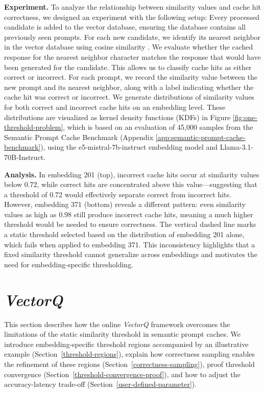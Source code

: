 \textbf{Experiment.} To analyze the relationship between similarity values and cache hit correctness, we designed an experiment with the following setup: Every processed candidate is added to the vector database, ensuring the database contains all previously seen prompts. For each new candidate, we identify its nearest neighbor in the vector database using cosine similarity \cite{rahutomo2012semantic}. We evaluate whether the cached response for the nearest neighbor character matches the response that would have been generated for the candidate. This allows us to classify cache hits as either correct or incorrect. For each prompt, we record the similarity value between the new prompt and its nearest neighbor, along with a label indicating whether the cache hit was correct or incorrect. We generate distributions of similarity values for both correct and incorrect cache hits on an embedding level. These distributions are visualized as kernel density functions (KDFs) in Figure \ref{fig:one-threshold-problem}, which is based on an evaluation of 45,000 samples from the Semantic Prompt Cache Benchmark (Appendix \ref{app:semantic-prompt-cache-benchmark}), using the e5-mistral-7b-instruct embedding model and Llama-3.1-70B-Instruct.

\textbf{Analysis.} In embedding 201 (top), incorrect cache hits occur at similarity values below 0.72, while correct hits are concentrated above this value—suggesting that a threshold of 0.72 would effectively separate correct from incorrect hits. However, embedding 371 (bottom) reveals a different pattern: even similarity values as high as 0.98 still produce incorrect cache hits, meaning a much higher threshold would be needed to ensure correctness. The vertical dashed line marks a static threshold selected based on the distribution of embedding 201 alone, which fails when applied to embedding 371. This inconsistency highlights that a fixed similarity threshold cannot generalize across embeddings and motivates the need for embedding-specific thresholding. 


\section{\textit{VectorQ}}
This section describes how the online \textit{VectorQ} framework overcomes the limitations of the static similarity threshold in semantic prompt caches. 
We introduce embedding-specific threshold regions accompanied by an illustrative example (Section~\ref{threshold-regions}), explain how correctness sampling enables the refinement of these regions (Section~\ref{correctness-sampling}), proof threshold convergence (Section~\ref{threshold-convergence-proof}), and how to adjust the accuracy-latency trade-off (Section~\ref{user-defined-parameter}). 

